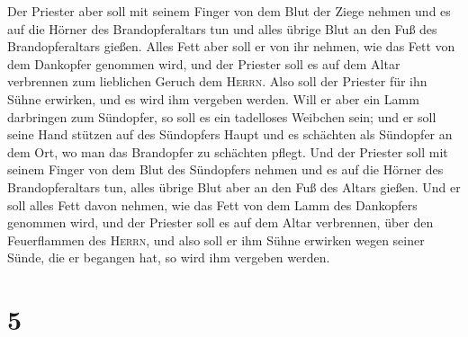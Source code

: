  Der Priester aber soll mit seinem Finger von dem Blut
der Ziege nehmen und es auf die Hörner des Brandopferaltars tun und
alles übrige Blut an den Fuß des Brandopferaltars gießen.
 Alles Fett aber soll er von ihr nehmen, wie das Fett von
dem Dankopfer genommen wird, und der Priester soll es auf dem Altar
verbrennen zum lieblichen Geruch dem \textsc{Herrn}. Also soll der
Priester für ihn Sühne erwirken, und es wird ihm vergeben werden.
 Will er aber ein Lamm darbringen zum Sündopfer, so soll
es ein tadelloses Weibchen sein;  und er soll seine Hand
stützen auf des Sündopfers Haupt und es schächten als Sündopfer an dem
Ort, wo man das Brandopfer zu schächten pflegt.  Und der
Priester soll mit seinem Finger von dem Blut des Sündopfers nehmen und
es auf die Hörner des Brandopferaltars tun, alles übrige Blut aber an
den Fuß des Altars gießen.  Und er soll alles Fett davon
nehmen, wie das Fett von dem Lamm des Dankopfers genommen wird, und der
Priester soll es auf dem Altar verbrennen, über den Feuerflammen des
\textsc{Herrn}, und also soll er ihm Sühne erwirken wegen seiner Sünde,
die er begangen hat, so wird ihm vergeben werden.

\hypertarget{section-4}{%
\section{5}\label{section-4}}

